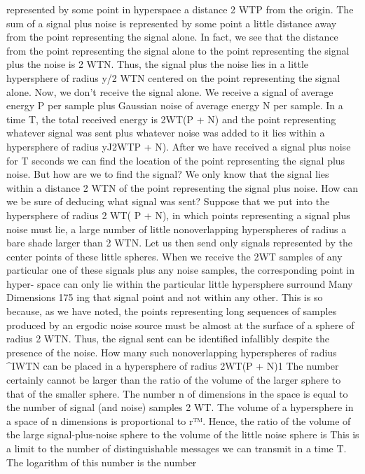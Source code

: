 {{{{{{{{{{represented by some point in hyperspace a distance \/2 WTP from
the origin. The sum of a signal plus noise is represented by some
point a little distance away from the point representing the signal
alone. In fact, we see that the distance from the point representing
the signal alone to the point representing the signal plus the noise
is \/2 WTN. Thus, the signal plus the noise lies in a little hypersphere
of radius y/2 WTN centered on the point representing the
signal alone.
Now, we don’t receive the signal alone. We receive a signal of
average energy P per sample plus Gaussian noise of average
energy N per sample. In a time T, the total received energy is
2WT(P + N) and the point representing whatever signal was
sent plus whatever noise was added to it lies within a hypersphere
of radius yJ2WT{P + N).
After we have received a signal plus noise for T seconds we can
find the location of the point representing the signal plus noise.
But how are we to find the signal? We only know that the signal
lies within a distance \/2 WTN of the point representing the signal
plus noise.
How can we be sure of deducing what signal was sent? Suppose
that we put into the hypersphere of radius \/2 WT( P + N), in
which points representing a signal plus noise must lie, a large
number of little nonoverlapping hyperspheres of radius a bare
shade larger than \/2 WTN. Let us then send only signals represented
by the center points of these little spheres.
When we receive the 2WT samples of any particular one of these
signals plus any noise samples, the corresponding point in hyper-
space can only lie within the particular little hypersphere surround
Many Dimensions
175
ing that signal point and not within any other. This is so because,
as we have noted, the points representing long sequences of samples
produced by an ergodic noise source must be almost at the surface
of a sphere of radius \/2 WTN. Thus, the signal sent can be identified
infallibly despite the presence of the noise.
How many such nonoverlapping hyperspheres of radius
^IWTN can be placed in a hypersphere of radius \/2WT(P + N)1
The number certainly cannot be larger than the ratio of the volume
of the larger sphere to that of the smaller sphere.
The number n of dimensions in the space is equal to the number
of signal (and noise) samples 2 WT. The volume of a hypersphere
in a space of n dimensions is proportional to r™. Hence, the ratio
of the volume of the large signal-plus-noise sphere to the volume
of the little noise sphere is
This is a limit to the number of distinguishable messages we can
transmit in a time T. The logarithm of this number is the number
}}}}}}}}}}}
